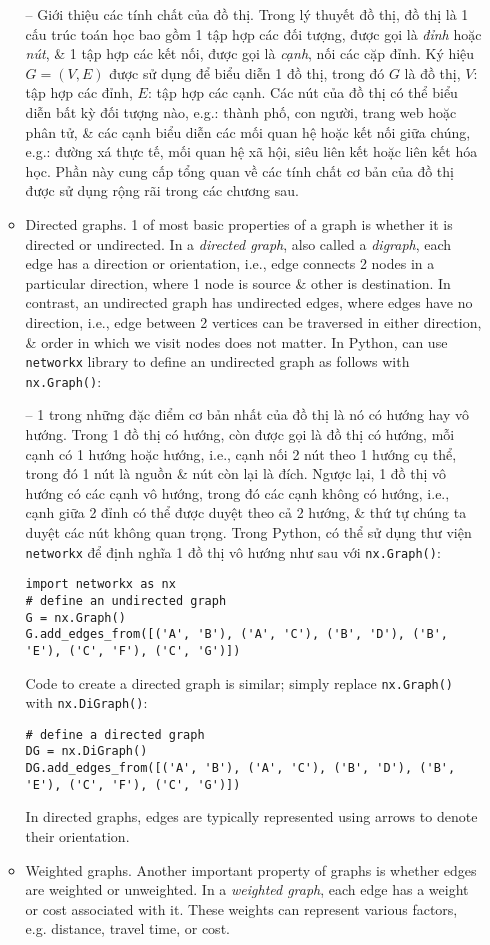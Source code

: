 \documentclass{article}
\begin{document}
\begin{itemize}
\begin{itemize}
        -- {\sf Giới thiệu các tính chất của đồ thị.} Trong lý thuyết đồ thị, đồ thị là 1 cấu trúc toán học bao gồm 1 tập hợp các đối tượng, được gọi là {\it đỉnh} hoặc {\it nút}, \& 1 tập hợp các kết nối, được gọi là {\it cạnh}, nối các cặp đỉnh. Ký hiệu $G = (V,E)$ được sử dụng để biểu diễn 1 đồ thị, trong đó $G$ là đồ thị, $V$: tập hợp các đỉnh, $E$: tập hợp các cạnh. Các nút của đồ thị có thể biểu diễn bất kỳ đối tượng nào, e.g.: thành phố, con người, trang web hoặc phân tử, \& các cạnh biểu diễn các mối quan hệ hoặc kết nối giữa chúng, e.g.: đường xá thực tế, mối quan hệ xã hội, siêu liên kết hoặc liên kết hóa học. Phần này cung cấp tổng quan về các tính chất cơ bản của đồ thị được sử dụng rộng rãi trong các chương sau.
        \item {\sf Directed graphs.} 1 of most basic properties of a graph is whether it is directed or undirected. In a {\it directed graph}, also called a {\it digraph}, each edge has a direction or orientation, i.e., edge connects 2 nodes in a particular direction, where 1 node is source \& other is destination. In contrast, an undirected graph has undirected edges, where edges have no direction, i.e., edge between 2 vertices can be traversed in either direction, \& order in which we visit nodes does not matter. In Python, can use {\tt networkx} library to define an undirected graph as follows with {\tt nx.Graph()}:

        -- 1 trong những đặc điểm cơ bản nhất của đồ thị là nó có hướng hay vô hướng. Trong 1 đồ thị có hướng, còn được gọi là đồ thị có hướng, mỗi cạnh có 1 hướng hoặc hướng, i.e., cạnh nối 2 nút theo 1 hướng cụ thể, trong đó 1 nút là nguồn \& nút còn lại là đích. Ngược lại, 1 đồ thị vô hướng có các cạnh vô hướng, trong đó các cạnh không có hướng, i.e., cạnh giữa 2 đỉnh có thể được duyệt theo cả 2 hướng, \& thứ tự chúng ta duyệt các nút không quan trọng. Trong Python, có thể sử dụng thư viện {\tt networkx} để định nghĩa 1 đồ thị vô hướng như sau với {\tt nx.Graph()}:
        \begin{verbatim}
import networkx as nx
# define an undirected graph
G = nx.Graph()
G.add_edges_from([('A', 'B'), ('A', 'C'), ('B', 'D'), ('B', 'E'), ('C', 'F'), ('C', 'G')])
        \end{verbatim}
        Code to create a directed graph is similar; simply replace {\tt nx.Graph()} with {\tt nx.DiGraph()}:
        \begin{verbatim}
# define a directed graph
DG = nx.DiGraph()
DG.add_edges_from([('A', 'B'), ('A', 'C'), ('B', 'D'), ('B', 'E'), ('C', 'F'), ('C', 'G')])
        \end{verbatim}
        In directed graphs, edges are typically represented using arrows to denote their orientation.
        \item {\sf Weighted graphs.} Another important property of graphs is whether edges are weighted or unweighted. In a {\it weighted graph}, each edge has a weight or cost associated with it. These weights can represent various factors, e.g. distance, travel time, or cost.


\end{itemize}
\end{itemize}
\end{document}
